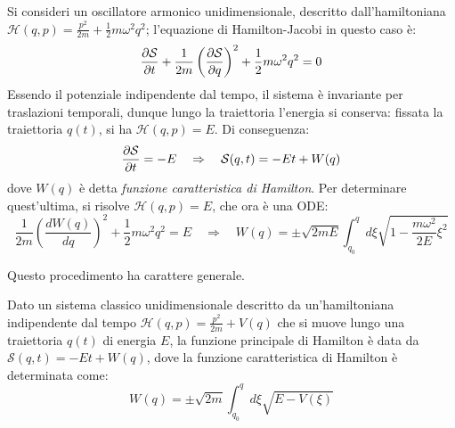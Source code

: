 \begin{example}
	Si consideri un oscillatore armonico unidimensionale, descritto dall'hamiltoniana $ \mathcal{H}(q,p) = \frac{p^2}{2m} + \frac{1}{2} m \omega^2 q^2 $; l'equazione di Hamilton-Jacobi in questo caso è:
	\begin{equation*}
		\frac{\partial \mathcal{S}}{\partial t} + \frac{1}{2m} \left( \frac{\partial \mathcal{S}}{\partial q} \right)^2 + \frac{1}{2} m \omega^2 q^2 = 0
	\end{equation*}
	Essendo il potenziale indipendente dal tempo, il sistema è invariante per traslazioni temporali, dunque lungo la traiettoria l'energia si conserva: fissata la traiettoria $ q(t) $, si ha $ \mathcal{H}(q,p) = E $. Di conseguenza:
	\begin{equation*}
		\frac{\partial \mathcal{S}}{\partial t} = -E
		\quad \Rightarrow \quad
		\mathcal{S}(q,t) = -E t + W(q)
	\end{equation*}
	dove $ W(q) $ è detta \textit{funzione caratteristica di Hamilton}. Per determinare quest'ultima, si risolve $ \mathcal{H}(q,p) = E $, che ora è una ODE:
	\begin{equation*}
		\frac{1}{2m} \left( \frac{d W(q)}{d q} \right)^2 + \frac{1}{2} m \omega^2 q^2 = E
		\quad \Rightarrow \quad
		W(q) = \pm \sqrt{2mE} \int_{q_0}^q d\xi \sqrt{1 - \frac{m \omega^2}{2E} \xi^2}
	\end{equation*}
\end{example}

Questo procedimento ha carattere generale.

\begin{proposition}
	Dato un sistema classico unidimensionale descritto da un'hamiltoniana indipendente dal tempo $ \mathcal{H}(q,p) = \frac{p^2}{2m} + V(q) $ che si muove lungo una traiettoria $ q(t) $ di energia $ E $, la funzione principale di Hamilton è data da $ \mathcal{S}(q,t) = -E t + W(q) $, dove la funzione caratteristica di Hamilton è determinata come:
	\begin{equation}
		W(q) = \pm \sqrt{2m} \int_{q_0}^q d\xi \sqrt{E - V(\xi)}
		\label{eq:4.7}
	\end{equation}
\end{proposition}

